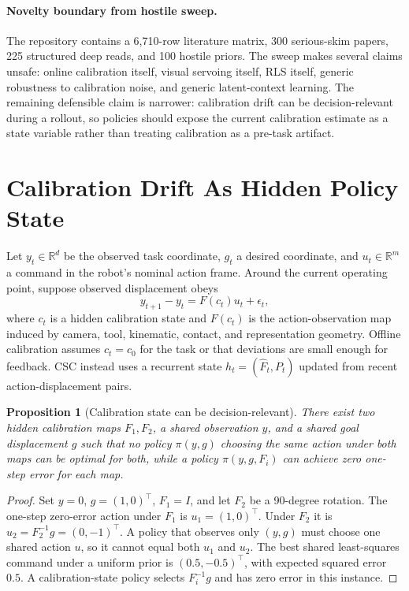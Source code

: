 \documentclass{article}
\newtheorem{proposition}{Proposition}
\newcommand{\obs}{y}
\newcommand{\goal}{g}
\newcommand{\act}{u}
\newcommand{\cmap}{F}
\newcommand{\cmaphat}{\hat F}
\newcommand{\cov}{P}
\newcommand{\state}{h}
\begin{document}
\paragraph{Novelty boundary from hostile sweep.}
The repository contains a 6,710-row literature matrix, 300 serious-skim papers,
225 structured deep reads, and 100 hostile priors. The sweep makes several
claims unsafe: online calibration itself, visual servoing itself, RLS itself,
generic robustness to calibration noise, and generic latent-context learning.
The remaining defensible claim is narrower: calibration drift can be
decision-relevant during a rollout, so policies should expose the current
calibration estimate as a state variable rather than treating calibration as a
pre-task artifact.

\section{Calibration Drift As Hidden Policy State}

Let $\obs_t\in\mathbb{R}^d$ be the observed task coordinate, $\goal_t$ a desired
coordinate, and $\act_t\in\mathbb{R}^m$ a command in the robot's nominal action
frame. Around the current operating point, suppose observed displacement obeys
\begin{equation}
  \obs_{t+1}-\obs_t = \cmap(c_t)\act_t+\epsilon_t,
\end{equation}
where $c_t$ is a hidden calibration state and $\cmap(c_t)$ is the
action-observation map induced by camera, tool, kinematic, contact, and
representation geometry. Offline calibration assumes $c_t=c_0$ for the task or
that deviations are small enough for feedback. CSC instead uses a recurrent
state $\state_t=(\cmaphat_t,\cov_t)$ updated from recent action-displacement
pairs.

\begin{proposition}[Calibration state can be decision-relevant]
There exist two hidden calibration maps $\cmap_1,\cmap_2$, a shared observation
$\obs$, and a shared goal displacement $\goal$ such that no policy
$\pi(\obs,\goal)$ choosing the same action under both maps can be optimal for
both, while a policy $\pi(\obs,\goal,\cmap_i)$ can achieve zero one-step error
for each map.
\end{proposition}

\begin{proof}
Set $\obs=0$, $\goal=(1,0)^\top$, $\cmap_1=I$, and let $\cmap_2$ be a 90-degree
rotation. The one-step zero-error action under $\cmap_1$ is
$\act_1=(1,0)^\top$. Under $\cmap_2$ it is
$\act_2=\cmap_2^{-1}\goal=(0,-1)^\top$. A policy that observes only
$(\obs,\goal)$ must choose one shared action $\act$, so it cannot equal both
$\act_1$ and $\act_2$. The best shared least-squares command under a uniform
prior is $(0.5,-0.5)^\top$, with expected squared error $0.5$. A
calibration-state policy selects $\cmap_i^{-1}\goal$ and has zero error in this
instance.
\end{proof}
\end{document}
